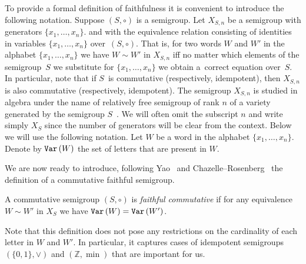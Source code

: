 \documentclass{toc}
\begin{document}
To provide a formal definition of faithfulness it is convenient to introduce the
following notation. Suppose $(S, \circ)$ is a
semigroup. Let $X_{S,n}$ be a semigroup with generators $\{x_1,\ldots, x_n\}$.
and with the equivalence relation  %
consisting of identities in variables $\{x_1,\ldots, x_n\}$ over~$(S,\circ)$.
That is, for two words $W$ and $W'$ in
the alphabet $\{x_1,\ldots,x_n\}$ we have $W\sim W'$ in $X_{S,n}$ iff no matter
which elements of the semigroup~$S$ we substitute for $\{x_1,\ldots, x_n\}$ we
obtain a~correct equation over~$S$. In particular, note that if $S$~is
commutative (respectively, idempotent), then $X_{S,n}$ is also commutative
(respectively, idempotent).
The semigroup $X_{S,n}$ is studied in algebra under the name of relatively free
semigroup of rank $n$ of a variety generated by
the   %
semigroup
$S$~\cite{neumann2012varieties}. %
We will often omit the subscript $n$ and write
simply $X_S$ since the number of generators will be clear from the context.
Below we will use the following notation. Let $W$ be a word in the alphabet
$\{x_1,\ldots, x_n\}$. Denote by $\texttt{Var}\,(W)$ the set of letters that are present
in $W$.

We are now ready to introduce,
following Yao~\cite{DBLP:conf/stoc/Yao82} and
Chazelle--Rosenberg~\cite{DBLP:journals/ijcga/ChazelleR91}  %
the definition of a commutative faithful semigroup.

\begin{definition}[Yao, Chazelle--Rosenberg]  %
\label{def:faithfulcommutative}
A commutative semigroup $(S, \circ)$ is \emph{faithful commutative} if for any
equivalence $W\sim W'$ in $X_S$ we have $\texttt{Var}\,(W)=\texttt{Var}\,(W')$.
\end{definition}


Note that this definition does not pose any restrictions on the cardinality of
each letter %
in $W$ and $W'$. In particular, it captures cases of idempotent semigroups
$(\{0,1\}, \vee)$ and $(\mathbb{Z},\min)$ that are important for us.
\end{document}
